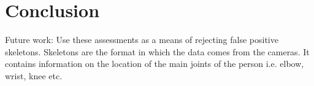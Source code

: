 \chapter{Conclusion}
\label{chap:conclusion}
%

Future work: Use these assessments as a means of rejecting false positive skeletons.
Skeletons are the format in which the data comes from the cameras. It contains
information on the location of the main joints of the person i.e. elbow, wrist,
knee etc.
